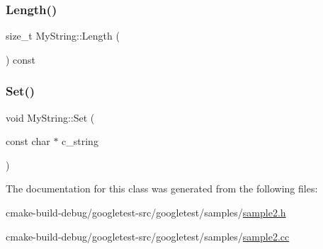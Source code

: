 \subsubsection{\texorpdfstring{Length()}{Length()}}
{\footnotesize\ttfamily size\+\_\+t My\+String\+::\+Length (\begin{DoxyParamCaption}{ }\end{DoxyParamCaption}) const\hspace{0.3cm}{\ttfamily [inline]}}

\mbox{\label{classMyString_a521c4cd7eccac6ce554d8a51505e4970}} 
\subsubsection{\texorpdfstring{Set()}{Set()}}
{\footnotesize\ttfamily void My\+String\+::\+Set (\begin{DoxyParamCaption}\item[{const char $\ast$}]{c\+\_\+string }\end{DoxyParamCaption})}



The documentation for this class was generated from the following files\+:\begin{DoxyCompactItemize}
\item 
cmake-\/build-\/debug/googletest-\/src/googletest/samples/\mbox{\hyperlink{sample2_8h}{sample2.\+h}}\item 
cmake-\/build-\/debug/googletest-\/src/googletest/samples/\mbox{\hyperlink{sample2_8cc}{sample2.\+cc}}\end{DoxyCompactItemize}
